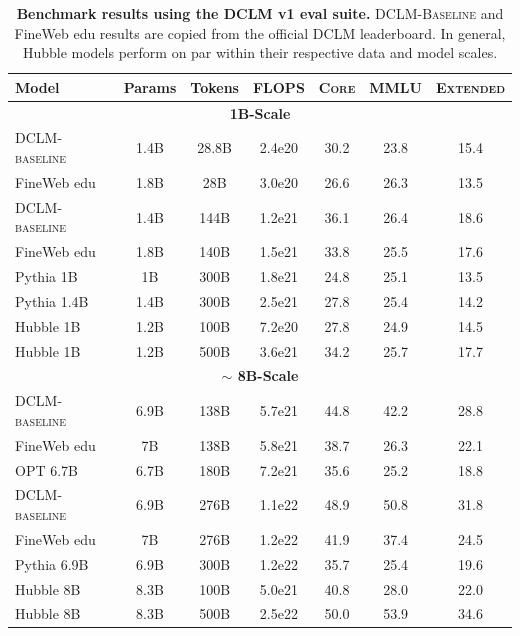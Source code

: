 \begin{table}[h]
\centering
\small
\caption{\textbf{Benchmark results using the DCLM v1 eval suite.} \textsc{DCLM-Baseline} and FineWeb edu results are copied from the official DCLM leaderboard. In general, Hubble models perform on par within their respective data and model scales. }
\label{tab:dclm_general_eval}
\begin{tabular}{lcccccc}
\toprule
Model & Params & Tokens & FLOPS & \textsc{Core} & MMLU & \textsc{Extended}\\ 
\midrule 
\multicolumn{7}{c}{\textbf{1B-Scale}} \\
\midrule
\textsc{DCLM-baseline} & 1.4B & 28.8B & 2.4e20 & 30.2 & 23.8 & 15.4 \\
FineWeb edu & 1.8B & 28B & 3.0e20 & 26.6 & 26.3 & 13.5 \\
\textsc{DCLM-baseline} & 1.4B & 144B & 1.2e21 & 36.1 & 26.4 & 18.6 \\
FineWeb edu & 1.8B & 140B & 1.5e21 & 33.8 & 25.5 & 17.6 \\
Pythia 1B & 1B & 300B & 1.8e21 & 24.8 & 25.1 & 13.5 \\
Pythia 1.4B & 1.4B & 300B & 2.5e21 & 27.8 & 25.4 & 14.2 \\
Hubble 1B & 1.2B & 100B & 7.2e20 & 27.8 & 24.9 & 14.5 \\ %
Hubble 1B & 1.2B & 500B & 3.6e21 & 34.2 & 25.7 & 17.7 \\ %

\midrule
\multicolumn{7}{c}{\textbf{$\sim$ 8B-Scale}} \\
\midrule 
\textsc{DCLM-baseline} & 6.9B & 138B & 5.7e21 & 44.8 & 42.2 & 28.8 \\
FineWeb edu & 7B & 138B & 5.8e21 & 38.7 & 26.3 & 22.1 \\
OPT 6.7B & 6.7B & 180B & 7.2e21 & 35.6 & 25.2 & 18.8 \\
\textsc{DCLM-baseline} & 6.9B & 276B & 1.1e22 & 48.9 & 50.8 & 31.8 \\
FineWeb edu & 7B & 276B & 1.2e22 & 41.9 & 37.4 & 24.5 \\
Pythia 6.9B & 6.9B & 300B & 1.2e22 & 35.7 & 25.4 & 19.6 \\
Hubble 8B & 8.3B & 100B & 5.0e21 & 40.8 & 28.0 & 22.0 \\ %
Hubble 8B & 8.3B & 500B & 2.5e22 & 50.0 & 53.9 & 34.6 \\ %

\bottomrule
\end{tabular}
\end{table}